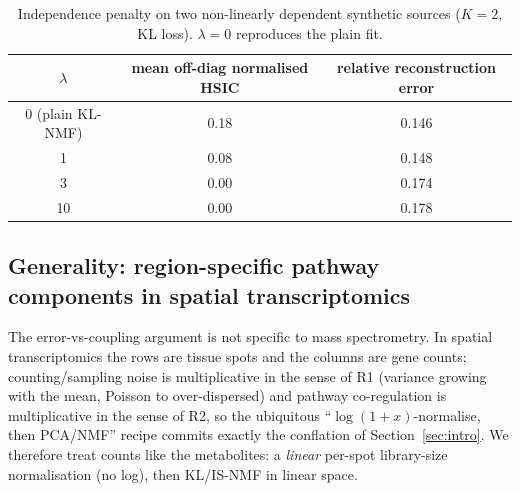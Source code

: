 \documentclass[11pt]{article}
\begin{document}
\begin{table}[t]
  \centering
  \caption{Independence penalty on two non-linearly dependent synthetic sources ($K = 2$, KL
  loss). $\lambda = 0$ reproduces the plain fit.}
  \label{tab:independence}
  \begin{tabular}{ccc}
    \toprule
    $\lambda$ & mean off-diag normalised HSIC & relative reconstruction error \\
    \midrule
    0 (plain KL-NMF) & 0.18 & 0.146 \\
    1  & 0.08 & 0.148 \\
    3  & 0.00 & 0.174 \\
    10 & 0.00 & 0.178 \\
    \bottomrule
  \end{tabular}
\end{table}

\subsection{Generality: region-specific pathway components in spatial transcriptomics}
\label{sec:spatial}

The error-vs-coupling argument is not specific to mass spectrometry. In spatial
transcriptomics the rows are tissue spots and the columns are gene counts; counting/sampling
noise is multiplicative in the sense of R1 (variance growing with the mean, Poisson to
over-dispersed) and pathway co-regulation is multiplicative in the sense of R2, so the
ubiquitous ``$\log(1+x)$-normalise, then PCA/NMF'' recipe commits exactly the conflation of
Section~\ref{sec:intro}. We therefore treat counts like the metabolites: a \emph{linear}
per-spot library-size normalisation (no log), then KL/IS-NMF in linear space.
\end{document}
